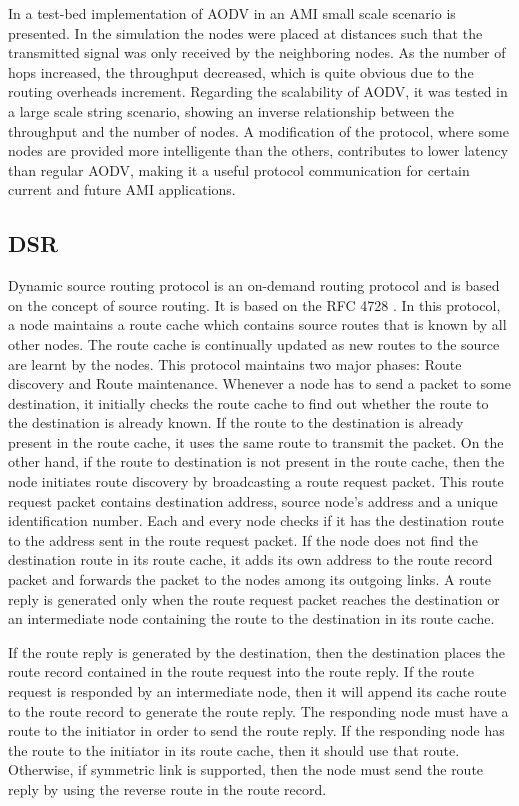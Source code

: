 \documentclass[11pt,draftclsnofoot,onecolumn]{IEEEtran}
\begin{document}
In \cite{Toimoor2013} a test-bed implementation of AODV in an AMI small scale scenario is presented. In the simulation the nodes were placed at distances such that the transmitted signal was only received by the neighboring nodes. As the number of hops increased, the throughput decreased, which is quite obvious due to the routing overheads increment. Regarding the scalability of AODV, it was tested in a large scale string scenario, showing an inverse relationship between the throughput and the number of nodes. A modification of the protocol, where some nodes are provided more intelligente than the others, contributes to lower latency than regular AODV, making it a useful protocol communication for certain current and future AMI applications.


\subsection{DSR}\label{dsr}

Dynamic source routing protocol is an on-demand routing protocol and is based on the concept of source routing. It is based on the RFC 4728 \cite{Johnson2007} . In this protocol, a node maintains a route cache which contains source routes that is known by all other nodes. The route cache is continually updated as new routes to the source are learnt by the nodes. This protocol maintains two major phases: Route discovery and Route maintenance. Whenever a node has to send a packet to some destination, it initially checks the route cache to find out whether the route to the destination is already known. If the route to the destination is already present in the route cache, it uses the same route to transmit the packet. On the other hand, if the route to destination is not present in the route cache, then the node initiates route discovery by broadcasting a route request packet. This route request packet contains destination address, source node’s address and a unique identification number. Each and every node checks if it has the destination route to the address sent in the route request packet. If the node does not find the destination route in its route cache, it adds its own address to the route record packet and forwards the packet to the nodes among its outgoing links. A route reply is generated only when the route request packet reaches the destination or an intermediate node containing the route to the destination in its route cache. 
	
If the route reply is generated by the destination, then the destination places the route record contained in the route request into the route reply. If the route request is responded by an intermediate node, then it will append its cache route to the route record to generate the route reply. The responding node must have a route to the initiator in order to send the route reply. If the responding node has the route to the initiator in its route cache, then it should use that route. Otherwise, if symmetric link is supported, then the node must send the route reply by using the reverse route in the route record. 
\end{document}
